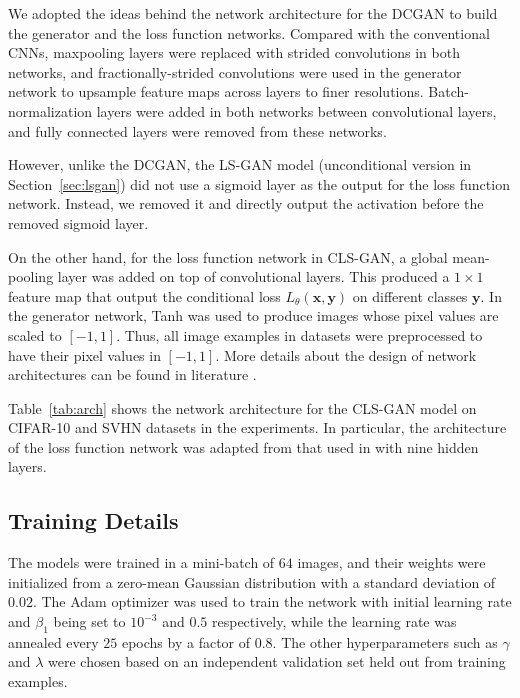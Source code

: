 \documentclass[11pt,fullpage, letterpaper,twoside]{article}
\newcommand{\1}[1]{\mathds{1}_{\left[#1\right]}}
\begin{document}
We adopted the ideas behind the network architecture for the DCGAN \cite{radford2015unsupervised} to build the generator and the loss function networks.  Compared with the conventional CNNs, maxpooling layers were replaced with strided convolutions in both networks, and fractionally-strided convolutions were used in the generator network to upsample feature maps across layers to finer resolutions.  Batch-normalization layers were added in both networks between convolutional layers, and fully connected layers were removed from these networks.

However, unlike the DCGAN, the LS-GAN model (unconditional version in Section~\ref{sec:lsgan}) did not use a sigmoid layer as the output for the loss function network.  Instead, we removed it and directly output the activation before the removed sigmoid layer.




On the other hand, for the loss function network in CLS-GAN, a global mean-pooling layer was added on top of convolutional layers.  This produced a $1\times 1$ feature map that output the conditional loss $L_\theta(\mathbf x, \mathbf y)$ on different classes $\mathbf y$.
In the generator network, Tanh was used to produce images whose pixel values are scaled to $[-1,1]$. Thus, all image examples in datasets were preprocessed to have their pixel values in $[-1,1]$.
More details about the design of network architectures can be found in literature \cite{radford2015unsupervised}.

Table~\ref{tab:arch} shows the network architecture for the CLS-GAN model on CIFAR-10 and SVHN datasets in the experiments.  In particular, the architecture of the loss function network was adapted from that used in \cite{springenberg2015unsupervised} with nine hidden layers.




\subsection{Training Details}
The models were trained in a mini-batch of $64$ images, and their weights were initialized from a zero-mean Gaussian distribution with a standard deviation of $0.02$. The Adam optimizer \cite{kingma2014adam} was used to train the network with initial learning rate and $\beta_1$ being set to $10^{-3}$ and $0.5$ respectively, while the learning rate was annealed every $25$ epochs by a factor of $0.8$. The other hyperparameters such as $\gamma$ and $\lambda$ were chosen based on an independent validation set held out from training examples.
\end{document}
